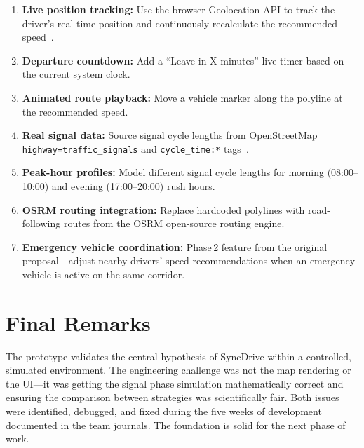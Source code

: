 \documentclass[12pt,a4paper]{report}
\begin{document}
\begin{enumerate}
  \item \textbf{Live position tracking:} Use the browser Geolocation API to
        track the driver's real-time position and continuously recalculate
        the recommended speed~\cite{OSM26}.
  \item \textbf{Departure countdown:} Add a ``Leave in X minutes'' live timer
        based on the current system clock.
  \item \textbf{Animated route playback:} Move a vehicle marker along the
        polyline at the recommended speed.
  \item \textbf{Real signal data:} Source signal cycle lengths from
        OpenStreetMap \texttt{highway=traffic\_signals} and
        \texttt{cycle\_time:*} tags~\cite{OSM26}.
  \item \textbf{Peak-hour profiles:} Model different signal cycle lengths for
        morning (08:00--10:00) and evening (17:00--20:00) rush hours.
  \item \textbf{OSRM routing integration:} Replace hardcoded polylines with
        road-following routes from the OSRM open-source routing engine.
  \item \textbf{Emergency vehicle coordination:} Phase\,2 feature from the
        original proposal---adjust nearby drivers' speed recommendations when
        an emergency vehicle is active on the same corridor.
\end{enumerate}

\section{Final Remarks}

The prototype validates the central hypothesis of SyncDrive within a
controlled, simulated environment. The engineering challenge was not the map
rendering or the UI---it was getting the signal phase simulation
mathematically correct and ensuring the comparison between strategies was
scientifically fair. Both issues were identified, debugged, and fixed during
the five weeks of development documented in the team journals. The foundation
is solid for the next phase of work.

\printbibliography[heading=bibintoc]
\end{document}
